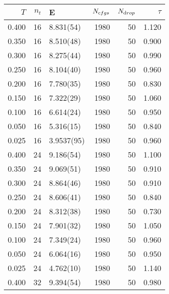 \begin{tabular}{rrlrrr}
\hline
   $T$ &   $n_t$ & E          &   $N_{\textrm cfgs}$ &   $N_{\textrm drop}$ &   $\tau$ \\
\hline
 0.400 &      16 & 8.831(54)  &                 1980 &                   50 &    1.120 \\
 0.350 &      16 & 8.510(48)  &                 1980 &                   50 &    0.900 \\
 0.300 &      16 & 8.275(44)  &                 1980 &                   50 &    0.990 \\
 0.250 &      16 & 8.104(40)  &                 1980 &                   50 &    0.960 \\
 0.200 &      16 & 7.780(35)  &                 1980 &                   50 &    0.830 \\
 0.150 &      16 & 7.322(29)  &                 1980 &                   50 &    1.060 \\
 0.100 &      16 & 6.614(24)  &                 1980 &                   50 &    0.950 \\
 0.050 &      16 & 5.316(15)  &                 1980 &                   50 &    0.840 \\
 0.025 &      16 & 3.9537(95) &                 1980 &                   50 &    0.960 \\
 0.400 &      24 & 9.186(54)  &                 1980 &                   50 &    1.100 \\
 0.350 &      24 & 9.069(51)  &                 1980 &                   50 &    0.910 \\
 0.300 &      24 & 8.864(46)  &                 1980 &                   50 &    0.910 \\
 0.250 &      24 & 8.606(41)  &                 1980 &                   50 &    0.840 \\
 0.200 &      24 & 8.312(38)  &                 1980 &                   50 &    0.730 \\
 0.150 &      24 & 7.901(32)  &                 1980 &                   50 &    1.050 \\
 0.100 &      24 & 7.349(24)  &                 1980 &                   50 &    0.960 \\
 0.050 &      24 & 6.064(16)  &                 1980 &                   50 &    0.950 \\
 0.025 &      24 & 4.762(10)  &                 1980 &                   50 &    1.140 \\
 0.400 &      32 & 9.394(54)  &                 1980 &                   50 &    0.980 \\

\end{tabular}
